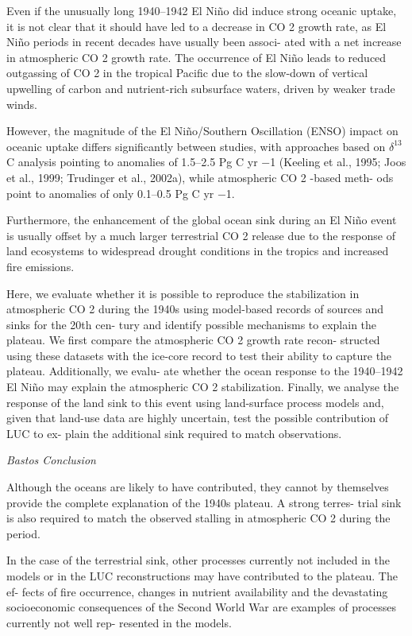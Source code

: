 \documentclass[
]{book}
\begin{document}
Even if the unusually long 1940--1942 El
Niño did induce strong oceanic uptake, it is not clear that
it should have led to a decrease in CO 2 growth rate, as El
Niño periods in recent decades have usually been associ-
ated with a net increase in atmospheric CO 2 growth rate.
The occurrence of El Niño leads to reduced outgassing of CO 2 in the
tropical Pacific due to the slow-down of vertical upwelling
of carbon and nutrient-rich subsurface waters, driven by
weaker trade winds.

However, the magnitude of the El Niño/Southern Oscillation (ENSO) impact
on oceanic uptake differs significantly between studies, with
approaches based on \(δ^{13}\)C analysis pointing to anomalies of
1.5--2.5 Pg C yr −1 (Keeling et al., 1995; Joos et al., 1999;
Trudinger et al., 2002a), while atmospheric CO 2 -based meth-
ods point to anomalies of only 0.1--0.5 Pg C yr −1.

Furthermore, the enhancement of the global ocean sink during an El Niño event
is usually offset by a much larger terrestrial CO 2 release due
to the response of land ecosystems to widespread drought
conditions in the tropics and increased fire emissions.

Here, we evaluate whether it is possible to reproduce the
stabilization in atmospheric CO 2 during the 1940s using
model-based records of sources and sinks for the 20th cen-
tury and identify possible mechanisms to explain the plateau.
We first compare the atmospheric CO 2 growth rate recon-
structed using these datasets with the ice-core record to test
their ability to capture the plateau. Additionally, we evalu-
ate whether the ocean response to the 1940--1942 El Niño
may explain the atmospheric CO 2 stabilization. Finally, we
analyse the response of the land sink to this event using
land-surface process models and, given that land-use data are
highly uncertain, test the possible contribution of LUC to ex-
plain the additional sink required to match observations.

\emph{Bastos Conclusion}

Although the oceans are likely to
have contributed, they cannot by themselves provide the
complete explanation of the 1940s plateau. A strong terres-
trial sink is also required to match the observed stalling in
atmospheric CO 2 during the period.

In the case of the terrestrial sink, other
processes currently not included in the models or in the LUC
reconstructions may have contributed to the plateau. The ef-
fects of fire occurrence, changes in nutrient availability and
the devastating socioeconomic consequences of the Second
World War are examples of processes currently not well rep-
resented in the models.
\end{document}
